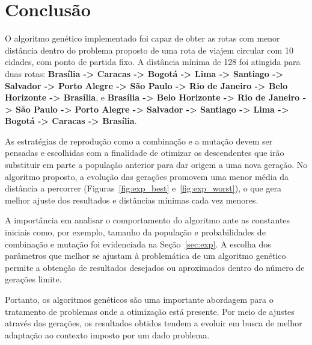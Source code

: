 \section{Conclusão}
    \label{sec:conc}
O algoritmo genético implementado foi capaz de obter as rotas com menor distância dentro do problema proposto de uma rota de viajem circular com 10 cidades, com ponto de partida fixo. A distância mínima de 128 foi atingida para duas rotas: \textbf{Brasília -> Caracas -> Bogotá -> Lima -> Santiago -> Salvador -> Porto Alegre -> São Paulo -> Rio de Janeiro -> Belo Horizonte -> Brasília}, e \textbf{Brasília -> Belo Horizonte -> Rio de Janeiro -> São Paulo -> Porto Alegre -> Salvador -> Santiago -> Lima -> Bogotá -> Caracas -> Brasília}.

As estratégias de reprodução como a combinação e a mutação devem ser pensadas e escolhidas com a finalidade de otimizar os descendentes que irão substituir em parte a população anterior para dar origem a uma nova geração. No algoritmo proposto, a evolução das gerações promovem uma menor média da distância a percorrer (Figuras~\ref{fig:exp_best} e~\ref{fig:exp_worst}), o que gera melhor ajuste dos resultados e distâncias mínimas cada vez menores.

A importância em analisar o comportamento do algoritmo ante as constantes iniciais como, por exemplo, tamanho da população e probabilidades de combinação e mutação foi evidenciada na Seção~\ref{sec:exp}. A escolha dos parâmetros que melhor se ajustam à problemática de um algoritmo genético permite a obtenção de resultados desejados ou aproximados dentro do número de gerações limite.

Portanto, os algoritmos genéticos são uma importante abordagem para o tratamento de problemas onde a otimização está presente. Por meio de ajustes através das gerações, os resultados obtidos tendem a evoluir em busca de melhor adaptação ao contexto imposto por um dado problema.